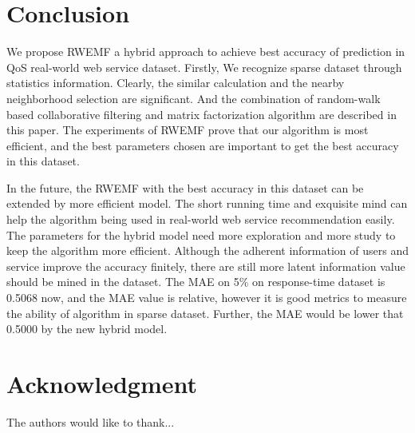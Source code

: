 \documentclass[conference]{IEEEtran}
\begin{document}
\section{Conclusion}\label{S-CN}
\par We propose RWEMF a hybrid approach to achieve best accuracy of prediction in QoS real-world web service dataset. Firstly, We recognize sparse dataset through statistics information. Clearly, the similar calculation and the nearby neighborhood selection are significant. And the combination of random-walk based collaborative filtering and matrix factorization algorithm are described in this paper. The experiments of RWEMF prove that our algorithm is most efficient, and the best parameters chosen are important to get the best accuracy in this dataset.
\par In the future, the RWEMF with the best accuracy in this dataset can be extended by more efficient model. The short running time and exquisite mind can help the algorithm being used in real-world web service recommendation easily. The parameters for the hybrid model need more exploration and more study to keep the algorithm more efficient. Although the adherent information of users and service improve the accuracy finitely, there are still more latent information\cite{liu_incorporating_2015}  value should be mined in the dataset. The MAE on 5\% on response-time dataset is 0.5068 now, and the MAE value is relative, however it is good metrics to measure the ability of algorithm in sparse dataset. Further, the MAE would be lower that 0.5000 by the new hybrid model.

\section*{Acknowledgment}
The authors would like to thank...




% 

\end{document}
